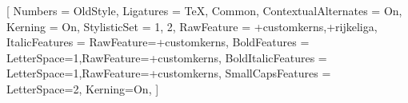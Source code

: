 \setmainfont{STIX Two Text}[
  Numbers = OldStyle,
  Ligatures = {TeX, Common},
  ContextualAlternates = On,
  Kerning = On,
  StylisticSet = {1, 2},
  RawFeature = {+customkerns,+rijkeliga},
  ItalicFeatures = {RawFeature={+customkerns}},
  BoldFeatures = {LetterSpace=1,RawFeature={+customkerns}},
  BoldItalicFeatures = {LetterSpace=1,RawFeature={+customkerns}},
  SmallCapsFeatures = {LetterSpace=2, Kerning=On},
]

\linespread{1.12}

\newcommand{\VersionFontName}{STIX Two}







